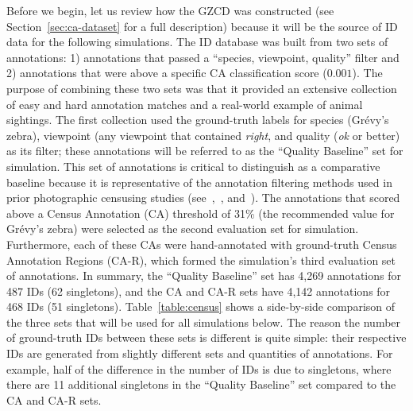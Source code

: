 Before we begin, let us review how the GZCD was constructed (see Section~\ref{sec:ca-dataset} for a full description) because it will be the source of ID data for the following simulations.  The ID database was built from two sets of annotations: 1) annotations that passed a ``species, viewpoint, quality'' filter and 2) annotations that were above a specific CA classification score ($0.001$).  The purpose of combining these two sets was that it provided an extensive collection of easy and hard annotation matches and a real-world example of animal sightings.  The first collection used the ground-truth labels for species (Gr\'evy's zebra), viewpoint (any viewpoint that contained \textit{right}, and quality (\textit{ok} or better) as its filter; these annotations will be referred to as the ``Quality Baseline'' set for simulation.  This set of annotations is critical to distinguish as a comparative baseline because it is representative of the annotation filtering methods used in prior photographic censusing studies (see~\cite{parham_photographic_2015},~\cite{berger-wolf_great_2016}, and~\cite{rubenstein_state_2018}).  The annotations that scored above a Census Annotation (CA) threshold of 31\% (the recommended value for Gr\'evy's zebra) were selected as the second evaluation set for simulation.  Furthermore, each of these CAs were hand-annotated with ground-truth Census Annotation Regions (CA-R), which formed the simulation's third evaluation set of annotations.  In summary, the ``Quality Baseline'' set has 4,269 annotations for 487 IDs (62 singletons), and the CA and CA-R sets have 4,142 annotations for 468 IDs (51 singletons).  Table~\ref{table:census} shows a side-by-side comparison of the three sets that will be used for all simulations below.  The reason the number of ground-truth IDs between these sets is different is quite simple: their respective IDs are generated from slightly different sets and quantities of annotations.  For example, half of the difference in the number of IDs is due to singletons, where there are 11 additional singletons in the ``Quality Baseline'' set compared to the CA and CA-R sets.

